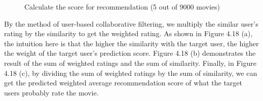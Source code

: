 \begin{figure}[htbp]
\centering
{}%
%
%
\centering
\caption{Calculate the score for recommendation (5 out of 9000 movies)}
\end{figure}
By the method of user-based collaborative filtering, we multiply the similar user’s rating by the similarity to get the weighted rating. As shown in Figure 4.18 (a), the intuition here is that the higher the similarity with the target user, the higher the weight of the target user's prediction score. Figure 4.18 (b) demonstrates the result of the sum of weighted ratings and the sum of similarity. Finally, in Figure 4.18 (c), by dividing the sum of weighted ratings by the sum of similarity, we can get the predicted weighted average recommendation score of what the target users probably rate the movie.


